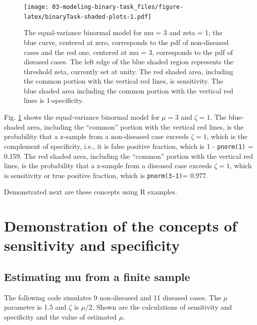 \documentclass[
]{book}
\begin{document}
\begin{figure}
\centering
\texttt{[image: 03-modeling-binary-task\_files/figure-latex/binaryTask-shaded-plots-1.pdf]}
\caption{\label{fig:binaryTask-shaded-plots}The equal-variance binormal model for mu = 3 and zeta = 1; the blue curve, centered at zero, corresponds to the pdf of non-diseased cases and the red one, centered at mu = 3, corresponds to the pdf of diseased cases. The left edge of the blue shaded region represents the threshold zeta, currently set at unity. The red shaded area, including the common portion with the vertical red lines, is sensitivity. The blue shaded area including the common portion with the vertical red lines is 1-specificity.}
\end{figure}

Fig. \ref{fig:binaryTask-shaded-plots} shows the equal-variance binormal model for \(\mu = 3\) and \(\zeta = 1\). The blue-shaded area, including the ``common'' portion with the vertical red lines, is the probability that a z-sample from a non-diseased case exceeds \(\zeta = 1\), which is the complement of specificity, i.e., it is false positive fraction, which is 1 - \texttt{pnorm(1)} = 0.159. The red shaded area, including the ``common'' portion with the vertical red lines, is the probability that a z-sample from a diseased case exceeds \(\zeta = 1\), which is sensitivity or true positive fraction, which is \texttt{pnorm(3-1)}= 0.977.

Demonstrated next are these concepts using R examples.

\hypertarget{demonstration-of-the-concepts-of-sensitivity-and-specificity}{%
\section{Demonstration of the concepts of sensitivity and specificity}\label{demonstration-of-the-concepts-of-sensitivity-and-specificity}}

\hypertarget{estimating-mu-from-a-finite-sample}{%
\subsection{Estimating mu from a finite sample}\label{estimating-mu-from-a-finite-sample}}

The following code simulates 9 non-diseased and 11 diseased cases. The \(\mu\) parameter is 1.5 and \(\zeta\) is \(\mu/2\). Shown are the calculations of sensitivity and specificity and the value of estimated \(\mu\).
\end{document}
